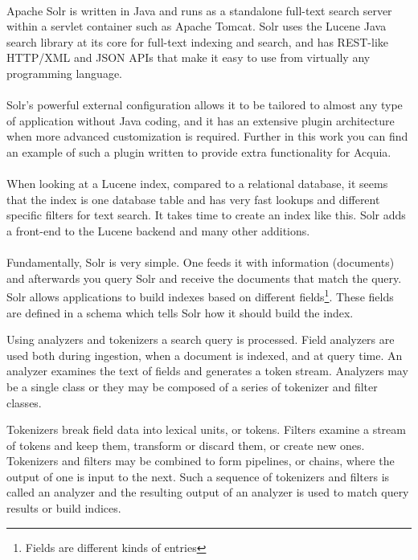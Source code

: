 \paragraph{}
Apache Solr is written in Java and runs as a standalone full-text search server within a servlet container such as Apache Tomcat. Solr uses the Lucene Java search library at its core for full-text indexing and search, and has REST-like HTTP/XML and JSON APIs that make it easy to use from virtually any programming language. 
\paragraph{}
Solr's powerful external configuration allows it to be tailored to almost any type of application without Java coding, and it has an extensive plugin architecture when more advanced customization is required. Further in this work you can find an example of such a plugin written to provide extra functionality for Acquia.
\paragraph{}
When looking at a Lucene index, compared to a relational database, it seems that the index is one database table and has very fast lookups and different specific filters for text search. It takes time to create an index like this. Solr adds a front-end to the Lucene backend and many other additions.
\paragraph{}
Fundamentally, Solr is very simple. One feeds it with information (documents) and afterwards you query Solr and receive the documents that match the query. Solr allows applications to build indexes based on different fields\footnote{Fields are different kinds of entries}. These fields are defined in a schema which tells Solr how it should build the index.

Using analyzers and tokenizers a search query is processed. Field analyzers are used both during ingestion, when a document is indexed, and at query time. An analyzer examines the text of fields and generates a token stream. Analyzers may be a single class or they may be composed of a series of tokenizer and filter classes.

Tokenizers break field data into lexical units, or tokens. Filters examine a stream of tokens and keep them, transform or discard them, or create new ones. Tokenizers and filters may be combined to form pipelines, or chains, where the output of one is input to the next. Such a sequence of tokenizers and filters is called an analyzer and the resulting output of an analyzer is used to match query results or build indices.

